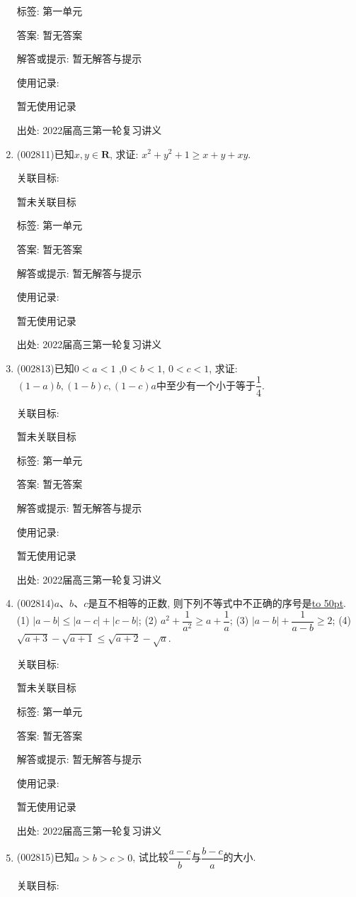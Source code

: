 \documentclass[10pt,a4paper]{article}
\newcommand{\blank}[1]{\underline{\hbox to #1pt{}}}
\begin{document}
\begin{enumerate}[1.]
标签: 第一单元

答案: 暂无答案

解答或提示: 暂无解答与提示

使用记录:

暂无使用记录


出处: 2022届高三第一轮复习讲义
\item { (002811)}已知$x,y\in \mathbf{R}$, 求证: $x^2+y^2+1\ge x+y+xy$.


关联目标:

暂未关联目标



标签: 第一单元

答案: 暂无答案

解答或提示: 暂无解答与提示

使用记录:

暂无使用记录


出处: 2022届高三第一轮复习讲义
\item { (002813)}已知$0<a<1$ ,$0<b<1$, $0<c<1$, 求证: $(1-a)b,(1-b)c,(1-c)a$中至少有一个小于等于$\dfrac 14$.


关联目标:

暂未关联目标



标签: 第一单元

答案: 暂无答案

解答或提示: 暂无解答与提示

使用记录:

暂无使用记录


出处: 2022届高三第一轮复习讲义
\item { (002814)}$a$、$b$、$c$是互不相等的正数, 则下列不等式中不正确的序号是\blank{50}.\\
(1) $|a-b|\le |a-c|+|c-b|$; (2) ${a^2}+\dfrac 1{a^2}\ge a+\dfrac 1a$; (3) $|a-b|+\dfrac 1{a-b}\ge 2$; (4) $\sqrt{a+3}-\sqrt{a+1}\le \sqrt{a+2}-\sqrt a$.


关联目标:

暂未关联目标



标签: 第一单元

答案: 暂无答案

解答或提示: 暂无解答与提示

使用记录:

暂无使用记录


出处: 2022届高三第一轮复习讲义
\item { (002815)}已知$a>b>c>0$, 试比较$\dfrac{a-c}b$与$\dfrac{b-c}a$的大小.


关联目标:


\end{enumerate}
\end{document}
